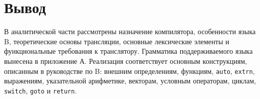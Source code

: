 \section{Вывод}

В аналитической части рассмотрены назначение компилятора, особенности языка B, теоретические основы трансляции, основные лексические элементы и функциональные требования к транслятору. Грамматика поддерживаемого языка вынесена в приложение А. Реализация соответствует основным конструкциям, описанным в руководстве по B: внешним определениям, функциям, \texttt{auto}, \texttt{extrn}, выражениям, указательной арифметике, векторам, условным операторам, циклам, \texttt{switch}, \texttt{goto} и \texttt{return}.
